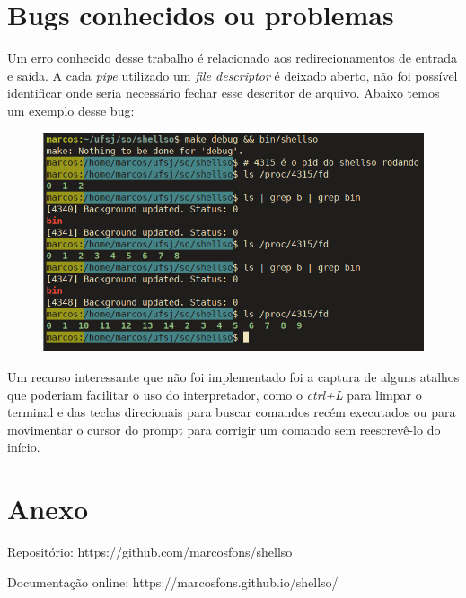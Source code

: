 \documentclass[a4paper, 12pt]{article}
\begin{document}
\section{Bugs conhecidos ou problemas}

Um erro conhecido desse trabalho é relacionado aos redirecionamentos
de entrada e saída. A cada \textit{pipe} utilizado um \textit{file descriptor} é deixado aberto,
não foi possível identificar onde seria necessário fechar esse descritor de arquivo. Abaixo temos um exemplo desse bug:

\begin{figure}[!ht]
	\centering
	\includegraphics[width=12cm]{relatorio/fd.jpeg}
\end{figure}

Um recurso interessante que não foi implementado foi a captura de alguns atalhos
que poderiam facilitar o uso do interpretador, como o \textit{ctrl+L} para limpar
o terminal e das teclas direcionais para buscar comandos recém executados ou para
movimentar o cursor do prompt para corrigir um comando sem reescrevê-lo do início.




\section*{Anexo}
Repositório: https://github.com/marcosfons/shellso

Documentação online: https://marcosfons.github.io/shellso/
\end{document}
